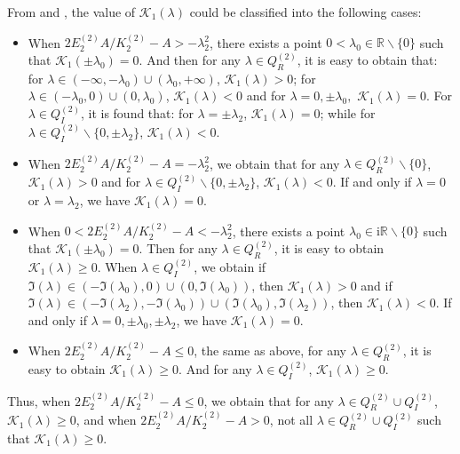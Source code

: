 \documentclass[11pt,reqno]{amsart}
\newcommand{\ii}{\mathrm{i}}
\numberwithin{equation}{section}
\begin{document}
\newenvironment{proof-kerin}{\emph{Proof of \Cref{prop:kerin}.}}{\hfill$\Box$\medskip}
\begin{proof-kerin}
From  and , the value of $\mathcal{K}_1(\lambda)$ could be classified into the following cases:
\begin{itemize}
	\item[(i)] When $2 E^{(2)}_2A/  K^{(2)}_2-A>-\lambda_2^2$, there exists a point $0<\lambda_0\in \mathbb{R}\backslash\{0\}$ such that $\mathcal{K}_1(\pm\lambda_0)=0$. And then for any $\lambda\in  Q^{(2)} _R$, it is easy to obtain that: for
	$\lambda \in (-\infty,-\lambda_0)\cup (\lambda_0,+\infty)$, $\mathcal{K}_1(\lambda)>0$; for $\lambda \in (-\lambda_0,0)\cup (0,\lambda_0)$, $\mathcal{K}_1(\lambda)<0$ and for $\lambda =0,\pm\lambda_0,$  $\mathcal{K}_1(\lambda)=0$. 
	For $\lambda\in  Q^{(2)} _I$, it is found that: for $\lambda =\pm\lambda_2$,  $\mathcal{K}_1(\lambda)=0$; while for $\lambda\in  Q^{(2)} _I\backslash\{0,\pm\lambda_2\}$, $\mathcal{K}_1(\lambda)<0$.
	\item[(ii)] When $2 E^{(2)}_2A/  K^{(2)}_2-A=-\lambda_2^2$, we obtain that for any $\lambda\in  Q^{(2)} _R\backslash\{0\}$, $\mathcal{K}_1(\lambda)>0$ and for $\lambda\in  Q^{(2)} _I\backslash\{0,\pm \lambda_{2}\}$, $\mathcal{K}_1(\lambda)<0$. 
	If and only if $\lambda=0$ or $\lambda=\lambda_2$, we have $\mathcal{K}_1(\lambda)=0$.
	
	\item[(iii)] When $0<2 E^{(2)}_2A/  K^{(2)}_2-A<-\lambda_2^2$, there exists a point $\lambda_0\in \ii \mathbb{R}\backslash\{0\}$ such that $\mathcal{K}_1(\pm\lambda_0)=0$. 
	Then for any $\lambda\in  Q^{(2)} _R$, it is easy to obtain 
	$\mathcal{K}_1(\lambda)\ge 0$.  
	When $\lambda\in  Q^{(2)} _I$, we obtain if $\Im(\lambda) \in (-\Im(\lambda_0),0)\cup(0,\Im(\lambda_0))$, then $\mathcal{K}_1(\lambda)> 0$ and if $\Im(\lambda) \in (-\Im(\lambda_2),-\Im(\lambda_0))\cup(\Im(\lambda_0),\Im(\lambda_2))$, then $\mathcal{K}_1(\lambda)<0$. If and only if $\lambda=0,\pm \lambda_0,\pm \lambda_2$, we have $\mathcal{K}_1(\lambda)=0$.
	\item[(iv)] When $2 E^{(2)}_2A/  K^{(2)}_2-A \le 0$, the same as above, for any $\lambda\in  Q^{(2)} _R$, it is easy to obtain 
	$\mathcal{K}_1(\lambda) \ge 0$. And  
	for any $\lambda\in  Q^{(2)} _I$, $\mathcal{K}_1(\lambda)\ge 0$.
\end{itemize} 
Thus, when $2 E^{(2)}_2A/  K^{(2)}_2-A\le 0$, we obtain that for any $\lambda \in  Q^{(2)} _R\cup  Q^{(2)} _I$, $\mathcal{K}_1(\lambda)\ge 0$, and when $2 E^{(2)}_2A/  K^{(2)}_2-A> 0$, not all $\lambda \in  Q^{(2)} _R\cup  Q^{(2)} _I$ such that $\mathcal{K}_1(\lambda)\ge 0$.



\end{proof-kerin}
\end{document}
